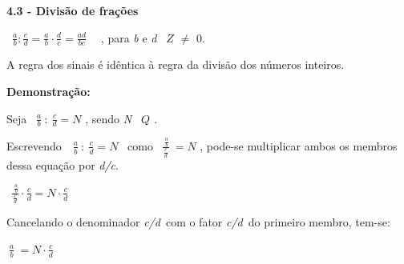 \documentclass[12pt]{article}
\renewcommand{\_}{\kern-1.5pt\textunderscore\kern-1.5pt}
\begin{document}
\vspace{\baselineskip}
\textbf{4.3 - Divisão de frações}\par


\vspace{\baselineskip}
\par 
\  \tab \tab  \( \frac{a}{b}:\frac{c}{d}=\frac{a}{b} \cdot \frac{d}{c}=\frac{ad}{bc}~~ \) \  , para \textit{b} e \textit{d} \textit{\   \( Z \) }  $ \neq $   0.\par

\setlength{\parskip}{0.0pt}
\begin{adjustwidth}{0.49in}{0.0in}
A regra dos sinais é idêntica à regra da divisão dos números inteiros.\par

\end{adjustwidth}


\vspace{\baselineskip}
\tab \textbf{Demonstração: }\par


\vspace{\baselineskip}
Seja \   \( \frac{a}{b}~:~\frac{c}{d}=N \) , sendo \textit{N} \textit{\   \( Q \) .}\par

\setlength{\parskip}{8.04pt}
\begin{adjustwidth}{0.2in}{0.0in}
Escrevendo\ \   \( \frac{a}{b}~:~\frac{c}{d}=N \) \  como  \( ~~\frac{~\frac{a}{b}}{\frac{c}{d}}~ =N \)  , pode-se multiplicar ambos os membros dessa equação por \textit{d/c}.\par

\end{adjustwidth}

\tab  \( ~~\frac{~\frac{a}{b}}{\frac{c}{d}}  \cdot  \frac{c}{d} =N  \cdot  \frac{c}{d} \) \par

Cancelando o denominador \textit{c/d}\  com o fator \textit{c/d}\  do primeiro membro, tem-se:\par

\tab  \( ~\frac{a}{b}~ =N  \cdot  \frac{c}{d} \) \par
\end{document}

